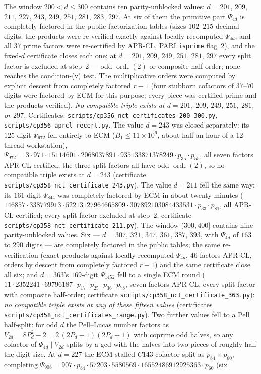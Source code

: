 \documentclass[11pt]{amsart}
\theoremstyle{plain}
\theoremstyle{definition}
\theoremstyle{remark}
\numberwithin{equation}{section}
\newcommand{\ord}{\operatorname{ord}}
\begin{document}
The window $200 < d \leq 300$ contains ten parity-unblocked values: $d = 201$, $209$, $211$, $227$, $243$, $249$, $251$, $281$, $283$, $297$. At six of them the primitive part $\Psi_{4d}$ is completely factored in the public factorization tables (sizes $102$--$215$ decimal digits; the products were re-verified exactly against locally recomputed $\Psi_{4d}$, and all $37$ prime factors were re-certified by APR-CL, PARI \texttt{isprime} flag~$2$), and the fixed-$d$ certificate closes each one: at $d = 201$, $209$, $249$, $251$, $281$, $297$ every split factor is excluded at step~2 --- odd $\ord_r(2)$ or composite half-order; none reaches the condition-(v) test. The multiplicative orders were computed by explicit descent from completely factored $r-1$ (four stubborn cofactors of $37$--$70$ digits were factored by ECM for this purpose; every piece was certified prime and the products verified). \emph{No compatible triple exists at $d = 201$, $209$, $249$, $251$, $281$, or $297$.} Certificates: \texttt{scripts/}\allowbreak\texttt{cp356\_nct\_certificates\_200\_300.py}, \texttt{scripts/}\allowbreak\texttt{cp356\_aprcl\_recert.py}. The value $d = 243$ was closed separately: its $125$-digit $\Psi_{972}$ fell entirely to ECM ($B_1 \leq 11{\times}10^6$, about half an hour of a 12-thread workstation), $\Psi_{972} = 3\cdot971\cdot15114601\cdot2068037891\cdot935133871378249\cdot p_{35}\cdot p_{55}$, all seven factors APR-CL-certified; the three split factors all have odd $\ord_r(2)$, so no compatible triple exists at $d = 243$ (certificate \texttt{scripts/}\allowbreak\texttt{cp358\_nct\_certificate\_243.py}). The value $d = 211$ fell the same way: its $161$-digit $\Psi_{844}$ was completely factored by ECM in about twenty minutes ($146857 \cdot 338779913 \cdot 52213127964665809 \cdot 307892103084433531 \cdot p_{33} \cdot p_{81}$, all APR-CL-certified; every split factor excluded at step~2; certificate \texttt{scripts/}\allowbreak\texttt{cp358\_nct\_certificate\_211.py}). The window $(300, 400]$ contains nine parity-unblocked values. Six --- $d = 307$, $321$, $347$, $361$, $387$, $393$, with $\Psi_{4d}$ of $163$ to $290$ digits --- are completely factored in the public tables; the same re-verification (exact products against locally recomputed $\Psi_{4d}$, $46$ factors APR-CL, orders by descent from completely factored $r - 1$) and the same certificate close all six; and $d = 363$'s $169$-digit $\Psi_{1452}$ fell to a single ECM round ($11 \cdot 2352241 \cdot 69796187 \cdot p_{17} \cdot p_{25} \cdot p_{36} \cdot p_{78}$, seven factors APR-CL, every split factor with composite half-order; certificate \texttt{scripts/}\allowbreak\texttt{cp358\_nct\_certificate\_363.py}): \emph{no compatible triple exists at any of these fifteen values} (certificates \texttt{scripts/}\allowbreak\texttt{cp358\_nct\_certificates\_range.py}). Two further values fell to a Pell half-split: for odd $d$ the Pell--Lucas number factors as $V_{2d} = 8 P_d^2 - 2 = 2\,(2P_d - 1)(2P_d + 1)$ with coprime odd halves, so any cofactor of $\Psi_{4d} \mid V_{2d}$ splits by a gcd with the halves into two pieces of roughly half the digit size. At $d = 227$ the ECM-stalled $C143$ cofactor split as $p_{84} \times p_{60}$, completing $\Psi_{908} = 907 \cdot p_{84} \cdot 57203 \cdot 5580569 \cdot 16552486912925363 \cdot p_{60}$ (six 
\end{document}
